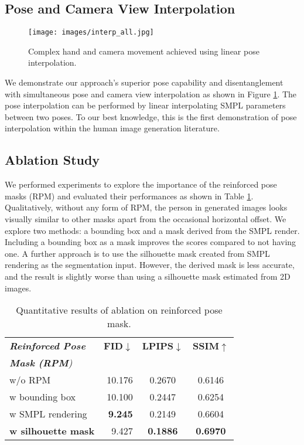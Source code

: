 \documentclass[10pt,twocolumn,letterpaper]{article}
\begin{document}
\subsection{Pose and Camera View Interpolation}
\vspace{-4mm}
\begin{figure}[!ht]
\centering
    \texttt{[image: images/interp\_all.jpg]}
\caption{Complex hand and camera movement achieved using linear pose interpolation.}
\label{fig:interpolation}
\end{figure}
We demonstrate  our approach's superior pose capability and disentanglement with simultaneous pose and camera view interpolation as shown in Figure \ref{fig:interpolation}. The pose interpolation can be performed by linear interpolating SMPL parameters between two poses. To our best knowledge, this is the first demonstration of pose interpolation within the human image generation literature. 

\subsection{Ablation Study}\label{sec:ablation}
We performed experiments to explore the importance of the reinforced pose masks (RPM) and evaluated their performances as shown in Table \ref{table:ablation}. Qualitatively, without any form of RPM, the person in generated images looks visually similar to other masks apart from the occasional horizontal offset. We explore two methods: a bounding box and a mask derived from the SMPL render. Including a bounding box as a mask improves the scores compared to not having one. A further approach is to use the silhouette mask created from SMPL rendering as the segmentation input. However, the derived mask is less accurate, and the result is slightly worse than using a silhouette mask estimated from 2D images. 

\begin{table}[h]
\centering
\begin{tabular}{l|r|c|c} 
\toprule
\textit{\textbf{Reinforced Pose }} &  \textbf{FID}$\downarrow$ & \textbf{LPIPS}$\downarrow$ & \textbf{SSIM}$\uparrow$   \\ 
\textit{\textbf{ Mask (RPM})} & & & \\
\toprule
  w/o RPM & 10.176 & 0.2670 & 0.6146 \\
w bounding box & 10.100 & 0.2447 & 0.6254 \\
 w SMPL rendering & \textbf{9.245} & 0.2149 & 0.6604   \\
  \textbf{w silhouette mask} & 9.427 & \textbf{0.1886} & \textbf{0.6970} \\
\bottomrule
\end{tabular}

\caption{Quantitative results of ablation on reinforced pose mask.}
\label{table:ablation}

\end{table}
\end{document}
